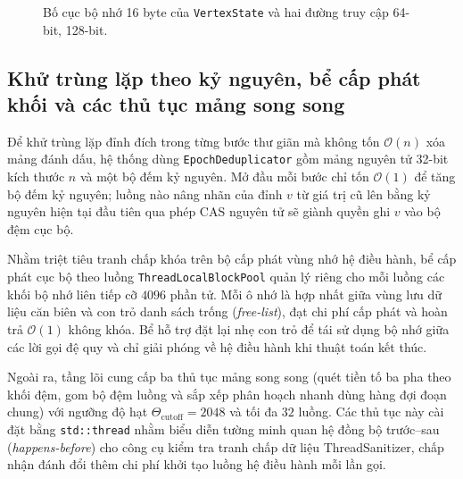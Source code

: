 \begin{figure}[htbp]
\caption{Bố cục bộ nhớ 16 byte của \texttt{VertexState} và hai đường truy cập 64-bit, 128-bit.}
\label{fig:vertex_state}
\end{figure}

\subsection{Khử trùng lặp theo kỷ nguyên, bể cấp phát khối và các thủ tục mảng song song}\label{subsec:c2-primitive-tools}

Để khử trùng lặp đỉnh đích trong từng bước thư giãn mà không tốn $\mathcal{O}(n)$ xóa mảng đánh dấu, hệ thống dùng \texttt{Epoch\allowbreak Deduplicator} gồm mảng nguyên tử 32-bit kích thước $n$ và một bộ đếm kỷ nguyên. Mở đầu mỗi bước chỉ tốn $\mathcal{O}(1)$ để tăng bộ đếm kỷ nguyên; luồng nào nâng nhãn của đỉnh $v$ từ giá trị cũ lên bằng kỷ nguyên hiện tại đầu tiên qua phép CAS nguyên tử sẽ giành quyền ghi $v$ vào bộ đệm cục bộ.

Nhằm triệt tiêu tranh chấp khóa trên bộ cấp phát vùng nhớ hệ điều hành, bể cấp phát cục bộ theo luồng \texttt{ThreadLocal\allowbreak BlockPool} quản lý riêng cho mỗi luồng các khối bộ nhớ liên tiếp cỡ $4096$ phần tử. Mỗi ô nhớ là hợp nhất giữa vùng lưu dữ liệu căn biên và con trỏ danh sách trống (\textit{free-list}), đạt chi phí cấp phát và hoàn trả $\mathcal{O}(1)$ không khóa. Bể hỗ trợ đặt lại nhẹ con trỏ để tái sử dụng bộ nhớ giữa các lời gọi đệ quy và chỉ giải phóng về hệ điều hành khi thuật toán kết thúc.

Ngoài ra, tầng lõi cung cấp ba thủ tục mảng song song (quét tiền tố ba pha theo khối đệm, gom bộ đệm luồng và sắp xếp phân hoạch nhanh dùng hàng đợi đoạn chung) với ngưỡng độ hạt $\Theta_{\mathrm{cutoff}} = 2048$ và tối đa $32$ luồng. Các thủ tục này cài đặt bằng \texttt{std::thread} nhằm biểu diễn tường minh quan hệ đồng bộ trước--sau (\textit{happens-before}) cho công cụ kiểm tra tranh chấp dữ liệu ThreadSanitizer, chấp nhận đánh đổi thêm chi phí khởi tạo luồng hệ điều hành mỗi lần gọi.

